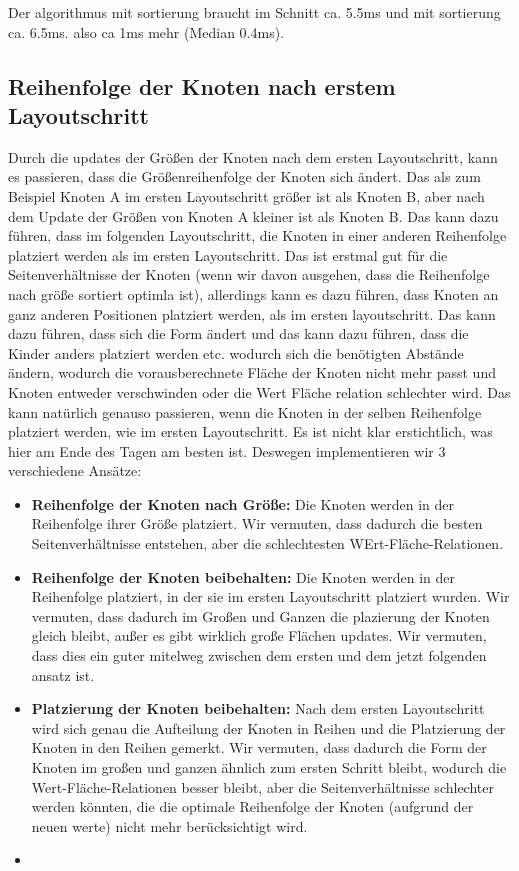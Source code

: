 Der algorithmus mit sortierung braucht im Schnitt ca. 5.5ms und mit sortierung ca. 6.5ms. also ca 1ms mehr (Median 0.4ms). 


\subsection{Reihenfolge der Knoten nach erstem Layoutschritt} \label{sec:ReihenfolgeKnotenErstesLayout}
Durch die updates der Größen der Knoten nach dem ersten Layoutschritt, kann es passieren, dass die Größenreihenfolge der Knoten sich ändert. Das als zum Beispiel Knoten A im ersten Layoutschritt größer ist als Knoten B, aber nach dem Update der Größen von Knoten A kleiner ist als Knoten B. Das kann dazu führen, dass im folgenden Layoutschritt, die Knoten in einer anderen Reihenfolge platziert werden als im ersten Layoutschritt. 
Das ist erstmal gut für die Seitenverhältnisse der Knoten (wenn wir davon ausgehen, dass die Reihenfolge nach größe sortiert optimla ist), allerdings kann es dazu führen, dass Knoten an ganz anderen Positionen platziert werden, als im ersten layoutschritt. Das  kann dazu führen, dass sich die Form ändert und das kann dazu führen, dass die Kinder anders platziert werden etc. wodurch sich die benötigten Abstände ändern, wodurch die vorausberechnete Fläche der Knoten nicht mehr passt und Knoten entweder verschwinden oder die Wert Fläche relation schlechter wird.
Das kann natürlich genauso passieren, wenn die Knoten in der selben Reihenfolge platziert werden, wie im ersten Layoutschritt. Es ist nicht klar erstichtlich, was hier am Ende des Tagen am besten ist. Deswegen implementieren wir 3 verschiedene Ansätze:
\begin{itemize}
    \item \textbf{Reihenfolge der Knoten nach Größe:} Die Knoten werden in der Reihenfolge ihrer Größe platziert. Wir vermuten, dass dadurch die besten Seitenverhältnisse entstehen, aber die schlechtesten WErt-Fläche-Relationen.
    \item \textbf{Reihenfolge der Knoten beibehalten:} Die Knoten werden in der Reihenfolge platziert, in der sie im ersten Layoutschritt platziert wurden. Wir vermuten, dass dadurch im Großen und Ganzen die plazierung der Knoten gleich bleibt, außer es gibt wirklich große Flächen updates. Wir vermuten, dass dies ein guter mitelweg zwischen dem ersten und dem jetzt folgenden ansatz ist.
    \item \textbf{Platzierung der Knoten beibehalten:} Nach dem ersten Layoutschritt wird sich genau die Aufteilung der Knoten in Reihen und die Platzierung der Knoten in den Reihen gemerkt. Wir vermuten, dass dadurch die Form der Knoten im großen und ganzen ähnlich zum ersten Schritt bleibt, wodurch die Wert-Fläche-Relationen besser bleibt, aber die Seitenverhältnisse schlechter werden könnten, die die optimale Reihenfolge der Knoten (aufgrund der neuen werte) nicht mehr berücksichtigt wird.
    \item 
\end{itemize} 

